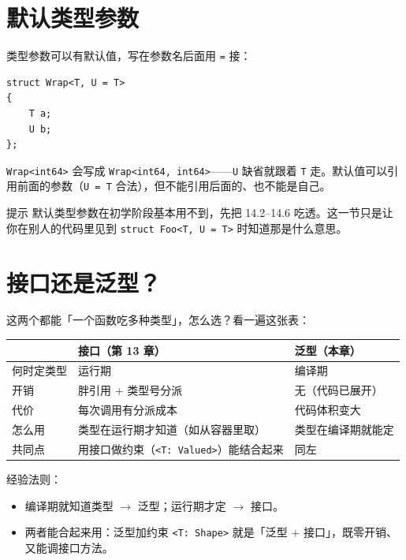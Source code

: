 \section{默认类型参数}

类型参数可以有默认值，写在参数名后面用 \texttt{=\allowbreak{}} 接：

\par
\medskip
\begin{lstlisting}[style=chali]
struct Wrap<T, U = T>
{
    T a;
    U b;
};
\end{lstlisting}
\par
\medskip

\texttt{Wrap<\allowbreak{}int64>\allowbreak{}} 会写成 \texttt{Wrap<\allowbreak{}int64,\allowbreak{} int64>\allowbreak{}}——\texttt{U} 缺省就跟着 \texttt{T} 走。默认值可以引用前面的参数（\texttt{U =\allowbreak{} T} 合法），但不能引用后面的、也不能是自己。

\begin{tip}{提示}
默认类型参数在初学阶段基本用不到，先把 14.2–14.6 吃透。这一节只是让你在别人的代码里见到 \texttt{struct Foo<\allowbreak{}T,\allowbreak{} U =\allowbreak{} T>\allowbreak{}} 时知道那是什么意思。
\end{tip}

\section{接口还是泛型？}

这两个都能「一个函数吃多种类型」，怎么选？看一遍这张表：

\begin{center}
\begin{tabular}{lll}
\toprule
 & 接口（第 13 章） & 泛型（本章） \\
\midrule
何时定类型 & 运行期 & 编译期 \\
开销 & 胖引用 + 类型号分派 & 无（代码已展开） \\
代价 & 每次调用有分派成本 & 代码体积变大 \\
怎么用 & 类型在运行期才知道（如从容器里取） & 类型在编译期就能定 \\
共同点 & 用接口做约束（\texttt{<\allowbreak{}T:\allowbreak{} Valued>\allowbreak{}}）能结合起来 & 同左 \\
\bottomrule
\end{tabular}
\end{center}

经验法则：

\begin{itemize}

\item 编译期就知道类型 \ensuremath{\rightarrow} 泛型；运行期才定 \ensuremath{\rightarrow} 接口。

\item 两者能合起来用：泛型加约束 \texttt{<\allowbreak{}T:\allowbreak{} Shape>\allowbreak{}} 就是「泛型 + 接口」，既零开销、又能调接口方法。

\end{itemize}

